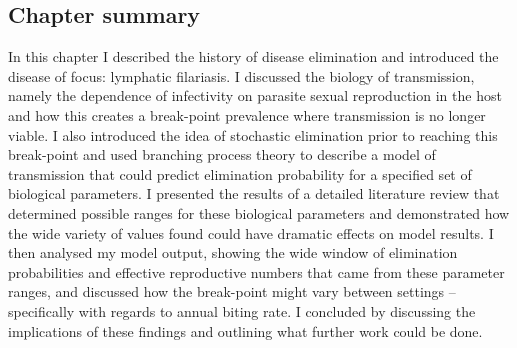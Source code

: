 \subsection{Chapter summary}

In this chapter I described the history of disease elimination and introduced the disease of focus: lymphatic filariasis. I discussed the biology of transmission, namely the dependence of infectivity on parasite sexual reproduction in the host and how this creates a break-point prevalence where transmission is no longer viable. I also introduced the idea of stochastic elimination prior to reaching this break-point and used branching process theory to describe a model of transmission that could predict elimination probability for a specified set of biological parameters. I presented the results of a detailed literature review that determined possible ranges for these biological parameters and demonstrated how the wide variety of values found could have dramatic effects on model results. I then analysed my model output, showing the wide window of elimination probabilities and effective reproductive numbers that came from these parameter ranges, and discussed how the break-point might vary between settings -- specifically with regards to annual biting rate. I concluded by discussing the implications of these findings and outlining what further work could be done.
